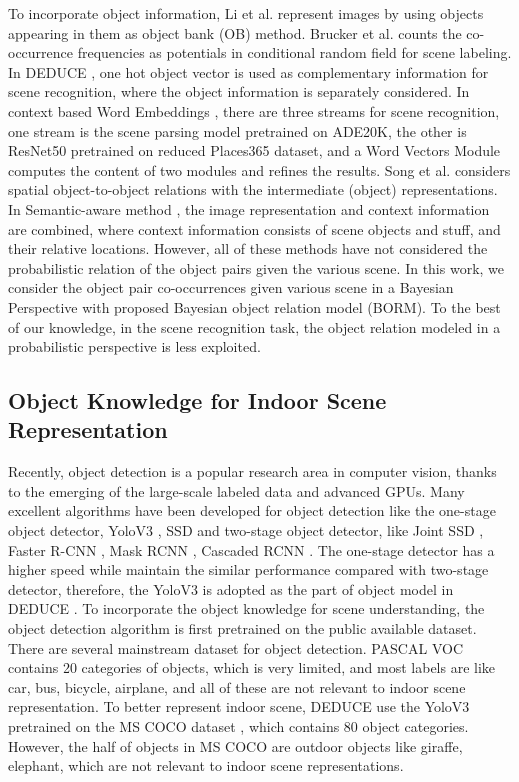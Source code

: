 \documentclass[letterpaper, 10 pt, conference]{ieeeconf}  %
\begin{document}
To incorporate object information, Li et al. \cite{Li2014} represent images by using objects appearing in them as object bank (OB) method. Brucker et al. \cite{Brucker2018} counts the co-occurrence frequencies as potentials in conditional random field for scene labeling.
In DEDUCE \cite{pal2019deduce}, one hot object vector is used as complementary information for scene recognition, where the object information is separately considered. In context based Word Embeddings \cite{chen2019scene}, there are three streams for scene recognition, one stream is the scene parsing model pretrained on ADE20K, the other is ResNet50 pretrained on reduced Places365 dataset, and a Word Vectors Module computes the content of two modules and refines the results. Song et al. \cite{Song2017} considers spatial object-to-object relations with the intermediate (object) representations. In Semantic-aware method \cite{Lopez-Cifuentes2020}, the image representation and context information are combined, where context information consists of scene objects and stuff, and their relative locations. However, all of these methods have not considered the probabilistic relation of the object pairs given the various scene.
In this work, we consider the object pair co-occurrences given various scene in a Bayesian Perspective with proposed Bayesian object relation model (BORM). To the best of our knowledge, in the scene recognition task, the object relation modeled in a probabilistic perspective is less exploited.  

\subsection{Object Knowledge for Indoor Scene Representation}
Recently, object detection is a popular research area in computer vision, thanks to the emerging of the large-scale labeled data and advanced GPUs. Many excellent algorithms have been developed for object detection like the one-stage object detector, YoloV3 \cite{redmon2018yolov3}, SSD \cite{liu2016ssd} and two-stage object detector, like Joint SSD \cite{yi2018long}, Faster R-CNN \cite{Ren2015}, Mask RCNN \cite{he2017mask}, Cascaded RCNN \cite{cai2018cascade}. The one-stage detector has a higher speed while maintain the similar performance compared with two-stage detector, therefore, the YoloV3 is adopted as the part of object model in DEDUCE \cite{pal2019deduce}. To incorporate the object knowledge for scene understanding, the object detection algorithm is first pretrained on the public available dataset. There are several mainstream dataset for object detection. PASCAL VOC \cite{Everingham2015} contains 20 categories of objects, which is very limited, and most labels are like car, bus, bicycle, airplane, and all of these are not relevant to indoor scene representation. To better represent indoor scene, DEDUCE use the YoloV3 pretrained on the MS COCO dataset \cite{lin2014microsoft}, which contains 80 object categories. However, the half of objects in MS COCO are outdoor objects like giraffe, elephant, which are not relevant to indoor scene representations. 
\end{document}
